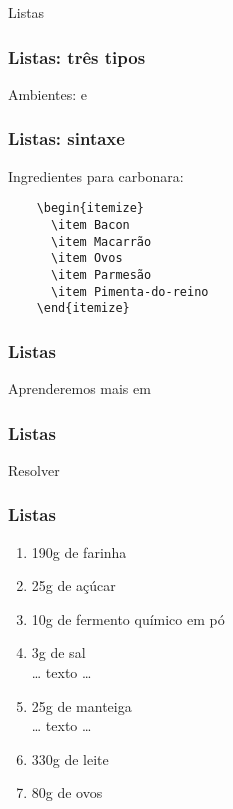 \begin{frame}[standout]
  \Huge
  Listas
\end{frame}

\begin{frame}
  \frametitle{Listas: três tipos}
  \LARGE
  Ambientes:  e 
\end{frame}

\begin{frame}[fragile]
  \frametitle{Listas: sintaxe}
  \LARGE
  Ingredientes para carbonara:

  \begin{verbatim}
    \begin{itemize}
      \item Bacon
      \item Macarrão
      \item Ovos
      \item Parmesão
      \item Pimenta-do-reino
    \end{itemize}
  \end{verbatim}
\end{frame}

\begin{frame}
  \frametitle{Listas}
  \Huge
  Aprenderemos mais em 
\end{frame}

\begin{frame}
  \frametitle{Listas}
  \Huge
  Resolver 
\end{frame}

\begin{frame}
  \frametitle{Listas}
  \large
  \begin{enumerate}[{Ingrediente} 1)]
    \item 190g de farinha
    \item 25g de açúcar
    \item 10g de fermento químico em pó
    \item 3g de sal\\[1em] … texto …\\[1em]
    \item 25g de manteiga\\[1em] … texto …\\[1em]
    \item 330g de leite
    \item 80g de ovos
  \end{enumerate}
\end{frame}
